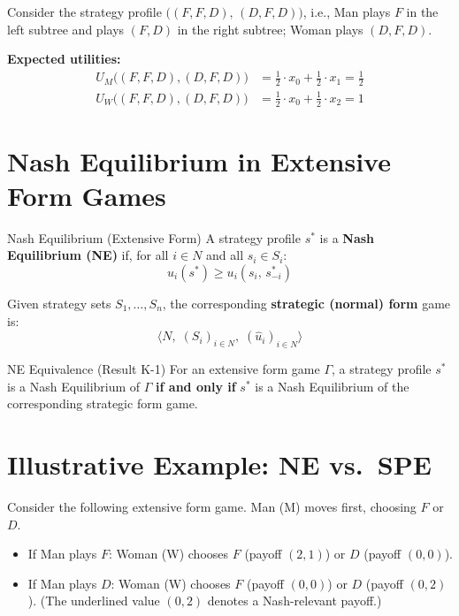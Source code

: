 \documentclass[12pt, a4paper]{article}
\begin{document}
\medskip
\noindent Consider the strategy profile $\bigl((F,F,D),\,(D,F,D)\bigr)$, i.e., Man plays $F$ in the left subtree and plays $(F,D)$ in the right subtree; Woman plays $(D,F,D)$.

\noindent\textbf{Expected utilities:}
\begin{align*}
  U_M\!\bigl((F,F,D),(D,F,D)\bigr)
    &= \tfrac{1}{2}\cdot x_0 + \tfrac{1}{2}\cdot x_1 = \tfrac{1}{2}\\
  U_W\!\bigl((F,F,D),(D,F,D)\bigr)
    &= \tfrac{1}{2}\cdot x_0 + \tfrac{1}{2}\cdot x_2 = 1
\end{align*}

\section{Nash Equilibrium in Extensive Form Games}

\begin{defbox}{Nash Equilibrium (Extensive Form)}
  A strategy profile $s^*$ is a \textbf{Nash Equilibrium (NE)} if, for all $i \in N$ and all $s_i \in S_i$:
  \[
    u_i(s^*) \geq u_i(s_i,\, s^*_{-i})
  \]
\end{defbox}

Given strategy sets $S_1, \ldots, S_n$, the corresponding \textbf{strategic (normal) form} game is:
\[
  \langle N,\; (S_i)_{i \in N},\; (\hat{u}_i)_{i \in N} \rangle
\]

\begin{thmbox}{NE Equivalence (Result K-1)}
  For an extensive form game $\Gamma$, a strategy profile $s^*$ is a Nash Equilibrium of $\Gamma$ \textbf{if and only if} $s^*$ is a Nash Equilibrium of the corresponding strategic form game.
\end{thmbox}

\section{Illustrative Example: NE vs.\ SPE}

Consider the following extensive form game. Man (M) moves first, choosing $F$ or $D$.
\begin{itemize}
  \item If Man plays $F$: Woman (W) chooses $F$ (payoff $(2,1)$) or $D$ (payoff $(0,0)$).
  \item If Man plays $D$: Woman (W) chooses $F$ (payoff $(0,0)$) or $D$ (payoff $(0,2)$). (The underlined value $(0,2)$ denotes a Nash-relevant payoff.)
\end{itemize}
\end{document}
